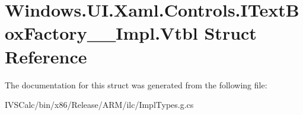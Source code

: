 \hypertarget{struct_windows_1_1_u_i_1_1_xaml_1_1_controls_1_1_i_text_box_factory_____impl_1_1_vtbl}{}\section{Windows.\+U\+I.\+Xaml.\+Controls.\+I\+Text\+Box\+Factory\+\_\+\+\_\+\+Impl.\+Vtbl Struct Reference}
\label{struct_windows_1_1_u_i_1_1_xaml_1_1_controls_1_1_i_text_box_factory_____impl_1_1_vtbl}


The documentation for this struct was generated from the following file\+:\begin{DoxyCompactItemize}
\item 
I\+V\+S\+Calc/bin/x86/\+Release/\+A\+R\+M/ilc/Impl\+Types.\+g.\+cs\end{DoxyCompactItemize}
